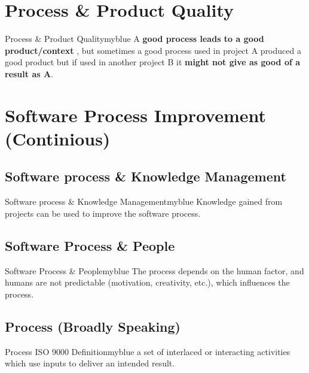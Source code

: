 \documentclass{report}
\begin{document}
\vspace{0.25cm}

\section{Process \& Product Quality}
\begin{prettyBox}{Process \& Product Quality}{myblue}
    A \textbf{good process leads to a good product/context} , but sometimes a good process used in project A 
    produced a good product but if used in another project B it \textbf{might not give as good of a result as A}. 
\end{prettyBox}

\vspace{0.25cm}
\section{Software Process Improvement (Continious)}

\subsection{Software process \& Knowledge Management}
\begin{prettyBox}{Software process \& Knowledge Management}{myblue}
 Knowledge gained from projects can be used to improve the software process.
\end{prettyBox}

\vspace{0.15cm}
\subsection{Software Process \& People}
\begin{prettyBox}{Software Process \& People}{myblue}
The process depends on the human factor, and humans are not predictable (motivation, creativity, etc.), which influences the process.
\end{prettyBox}

\vspace{0.15cm}
\subsection{Process (Broadly Speaking)}
\begin{prettyBox}{Process ISO 9000 Definition}{myblue}
    a set of interlaced or interacting activities which use inputs to deliver an intended result.
\end{prettyBox}
\end{document}
